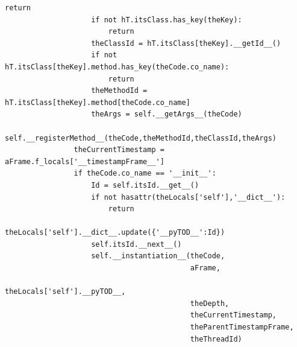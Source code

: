 \documentclass[12pt,legalpaper]{report}
\begin{document}
\begin{singlespace}
\begin{lstlisting}[style=Python]
                        return
                    if not hT.itsClass.has_key(theKey):
                        return
                    theClassId = hT.itsClass[theKey].__getId__()
                    if not hT.itsClass[theKey].method.has_key(theCode.co_name):
                        return
                    theMethodId = hT.itsClass[theKey].method[theCode.co_name]
                    theArgs = self.__getArgs__(theCode)
                    self.__registerMethod__(theCode,theMethodId,theClassId,theArgs)
                theCurrentTimestamp = aFrame.f_locals['__timestampFrame__']
                if theCode.co_name == '__init__':
                    Id = self.itsId.__get__()
                    if not hasattr(theLocals['self'],'__dict__'):
                        return
                    theLocals['self'].__dict__.update({'__pyTOD__':Id})
                    self.itsId.__next__()
                    self.__instantiation__(theCode,
                                           aFrame,
                                           theLocals['self'].__pyTOD__,
                                           theDepth,
                                           theCurrentTimestamp,
                                           theParentTimestampFrame,
                                           theThreadId)


\end{lstlisting}
\end{singlespace}
\end{document}
